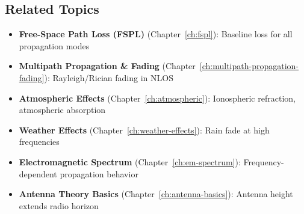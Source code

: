 \subsection*{Related Topics}

\begin{itemize}
\item \textbf{Free-Space Path Loss (FSPL)} (Chapter~\ref{ch:fspl}): Baseline loss for all propagation modes
\item \textbf{Multipath Propagation \& Fading} (Chapter~\ref{ch:multipath-propagation-fading}): Rayleigh/Rician fading in NLOS
\item \textbf{Atmospheric Effects} (Chapter~\ref{ch:atmospheric}): Ionospheric refraction, atmospheric absorption
\item \textbf{Weather Effects} (Chapter~\ref{ch:weather-effects}): Rain fade at high frequencies
\item \textbf{Electromagnetic Spectrum} (Chapter~\ref{ch:em-spectrum}): Frequency-dependent propagation behavior
\item \textbf{Antenna Theory Basics} (Chapter~\ref{ch:antenna-basics}): Antenna height extends radio horizon
\end{itemize}
